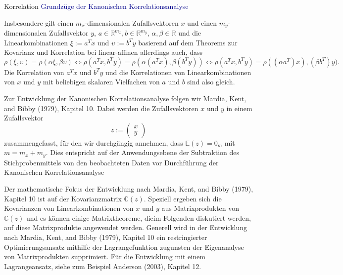 \documentclass[
  8pt,
  ignorenonframetext,
]{beamer}
\begin{document}
\begin{frame}{Korrelation}
\protect\hypertarget{korrelation-14}{}
\textcolor{darkblue}{Grundzüge der Kanonischen Korrelationsanalyse}

\footnotesize

Insbesondere gilt einen \(m_x\)-dimensionalen Zufallsvektoren \(x\) und
einen \(m_y\)-dimensionalen Zufallsvektor \(y\),
\(a \in \mathbb{R}^{m_x},b \in \mathbb{R}^{m_y}\),
\(\alpha,\beta \in \mathbb{R}\) und die Linearkombinationen
\(\xi := a^Tx\) und \(\upsilon := b^Ty\) basierend auf dem Theorems zur
Kovarianz und Korrelation bei linear-affinen allerdings auch, dass
\begin{equation*}
\rho(\xi,\upsilon) = \rho(\alpha\xi,\beta\upsilon)   
\Leftrightarrow
\rho(a^Tx, b^Ty)   = \rho(\alpha(a^Tx),\beta(b^Ty))  
\Leftrightarrow
\rho(a^Tx, b^Ty)   = \rho((\alpha a^T)x),(\beta b^T)y).
\end{equation*} Die Korrelation von \(a^Tx\) und \(b^Ty\) und die
Korrelationen von Linearkombinationen von \(x\) und \(y\) mit beliebigen
skalaren Vielfachen von \(a\) und \(b\) sind also gleich.

Zur Entwicklung der Kanonischen Korrelationsanalyse folgen wir Mardia,
Kent, and Bibby (1979), Kapitel 10. Dabei werden die Zufallsvektoren
\(x\) und \(y\) in einem Zufallsvektor \begin{equation}
z := \begin{pmatrix} x \\ y \end{pmatrix}
\end{equation} zusammengefasst, für den wir durchgängig annehmen, dass
\(\mathbb{E}(z) = 0_{m}\) mit \(m = m_x + m_y\). Dies entspricht auf der
Anwendungsebene der Subtraktion des Stichprobenmittels von den
beobachteten Daten vor Durchführung der Kanonischen Korrelationsanalyse

Der mathematische Fokus der Entwicklung nach Mardia, Kent, and Bibby
(1979), Kapitel 10 ist auf der Kovarianzmatrix \(\mathbb{C}(z)\).
Speziell ergeben sich die Kovarianzen von Linearkombinationen von \(x\)
und \(y\) aus Matrixprodukten von \(\mathbb{C}(z)\) und es können einige
Matrixtheoreme, dieim Folgenden diskutiert werden, auf diese
Matrixprodukte angewendet werden. Generell wird in der Entwicklung nach
Mardia, Kent, and Bibby (1979), Kapitel 10 ein restringierter
Optimierungsansatz mithilfe der Lagrangefunktion zugunsten der
Eigenanalyse von Matrixprodukten supprimiert. Für die Entwicklung mit
einem Lagrangeansatz, siehe zum Beispiel Anderson (2003), Kapitel 12.
\end{frame}
\end{document}
